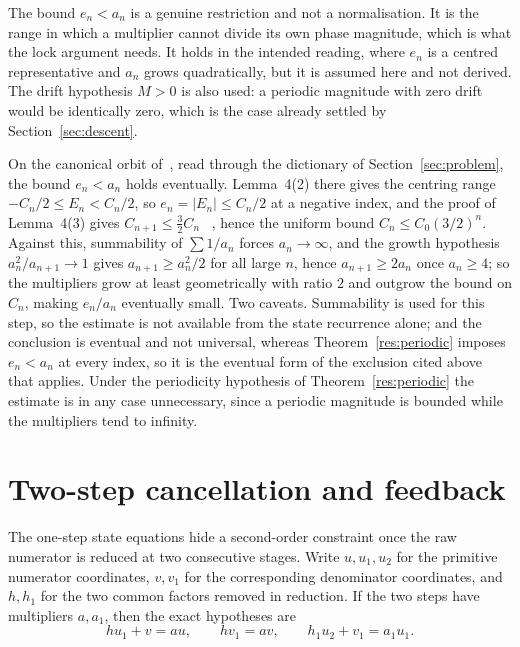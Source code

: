 The bound $e_n<a_n$ is a genuine restriction and not a normalisation.  It is
the range in which a multiplier cannot divide its own phase magnitude, which
is what the lock argument needs.  It holds in the intended reading, where
$e_n$ is a centred representative and $a_n$ grows quadratically, but it is
assumed here and not derived.  The drift hypothesis $M>0$ is also used: a
periodic magnitude with zero drift would be identically zero, which is the case
already settled by Section~\ref{sec:descent}.

\begin{remark}
On the canonical orbit of~\cite{koizumi2025}, read through the dictionary of
Section~\ref{sec:problem}, the bound $e_n<a_n$ holds eventually.  Lemma~4(2)
there gives the centring range $-C_n/2\le E_n<C_n/2$, so $e_n=|E_n|\le C_n/2$ at
a negative index, and the proof of Lemma~4(3) gives $C_{n+1}\le\tfrac32C_n$
~\cite[p.~11]{koizumi2025},
hence the uniform bound $C_n\le C_0(3/2)^{n}$.  Against this, summability of
$\sum1/a_n$ forces
$a_n\to\infty$, and the growth hypothesis $a_n^{2}/a_{n+1}\to1$ gives
$a_{n+1}\ge a_n^{2}/2$ for all large $n$, hence $a_{n+1}\ge2a_n$ once
$a_n\ge4$; so the multipliers grow at least geometrically with ratio $2$ and
outgrow the bound on $C_n$, making $e_n/a_n$ eventually small.  Two caveats.
Summability is used for this step, so the estimate is not available from the
state recurrence alone; and the conclusion is eventual and not universal,
whereas Theorem~\ref{res:periodic} imposes $e_n<a_n$ at every index, so it is
the eventual form of the exclusion cited above that applies.  Under the
periodicity hypothesis of Theorem~\ref{res:periodic} the estimate is in any
case unnecessary, since a periodic magnitude is bounded while the multipliers
tend to infinity.
\end{remark}


\section{Two-step cancellation and feedback}\label{app:feedback}

The one-step state equations hide a second-order constraint once the raw
numerator is reduced at two consecutive stages.  Write $u,u_1,u_2$ for the
primitive numerator coordinates, $v,v_1$ for the corresponding denominator
coordinates, and $h,h_1$ for the two common factors removed in reduction.  If
the two steps have multipliers $a,a_1$, then the exact hypotheses are
\[
 hu_1+v=au,\qquad hv_1=av,\qquad
 h_1u_2+v_1=a_1u_1.
\]

